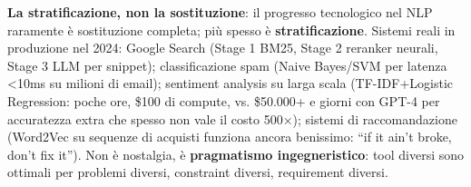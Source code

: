 \documentclass[12pt,a4paper]{article}
\begin{document}
\textbf{La stratificazione, non la sostituzione}: il progresso tecnologico nel NLP raramente \`e sostituzione completa; pi\`u spesso \`e \textbf{stratificazione}. Sistemi reali in produzione nel 2024: Google Search (Stage 1 BM25, Stage 2 reranker neurali, Stage 3 LLM per snippet); classificazione spam (Naive Bayes/SVM per latenza <10ms su milioni di email); sentiment analysis su larga scala (TF-IDF+Logistic Regression: poche ore, \$100 di compute, vs. \$50.000+ e giorni con GPT-4 per accuratezza extra che spesso non vale il costo 500$\times$); sistemi di raccomandazione (Word2Vec su sequenze di acquisti funziona ancora benissimo: ``if it ain't broke, don't fix it''). Non \`e nostalgia, \`e \textbf{pragmatismo ingegneristico}: tool diversi sono ottimali per problemi diversi, constraint diversi, requirement diversi.
\end{document}
